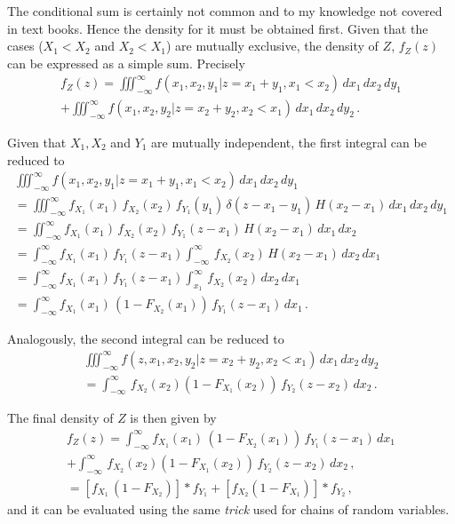 The conditional	 sum is certainly not common and to my knowledge not
covered in text books. Hence the density for it must be obtained first.
Given that the cases ($X_1<X_2$ and $X_2<X_1$) are mutually exclusive, the density of $Z$, 
$f_Z(z)$ can be expressed as a simple sum. Precisely
\begin{multline}
 f_Z(z) = \iiint_{-\infty}^\infty f(x_1,x_2,y_1|z=x_1+y_1,x_1<x_2)\,dx_1\,dx_2\,dy_1 \\
  + \iiint_{-\infty}^\infty f(x_1,x_2,y_2|z=x_2+y_2,x_2<x_1)\,dx_1\,dx_2\,dy_2\,. \nonumber
\end{multline}

Given that $X_1, X_2$ and $Y_1$ are mutually independent, the first integral can be reduced to
\begin{multline}
\iiint_{-\infty}^\infty f(x_1,x_2,y_1|z=x_1+y_1,x_1<x_2)\,dx_1\,dx_2\,dy_1 \\
  = \iiint_{-\infty}^\infty f_{X_1}(x_1)\,f_{X_2}(x_2)\,f_{Y_1}(y_1)\,\delta(z-x_1-y_1)\,H(x_2-x_1)\,dx_1\,dx_2\,dy_1\\
  = \iint_{-\infty}^\infty f_{X_1}(x_1)\,f_{X_2}(x_2)\,f_{Y_1}(z-x_1)\,H(x_2-x_1)\,dx_1\,dx_2\\
  = \int_{-\infty}^\infty f_{X_1}(x_1)\,f_{Y_1}(z-x_1)\int_{-\infty}^\infty \,f_{X_2}(x_2)\,H(x_2-x_1)\,dx_2\,dx_1\\
  = \int_{-\infty}^\infty f_{X_1}(x_1)\,f_{Y_1}(z-x_1)\int_{x_1}^{\infty} \,f_{X_2}(x_2)\,dx_2\,dx_1\\
  = \int_{-\infty}^\infty f_{X_1}(x_1)\,\left(1-F_{X_2}(x_1)\right)\,f_{Y_1}(z-x_1)\,dx_1\,. \nonumber
\end{multline}

Analogously, the second integral can be reduced to
\begin{multline}
\iiint_{-\infty}^\infty f(z,x_1,x_2,y_2|z=x_2+y_2,x_2<x_1)\,dx_1\,dx_2\,dy_2 \\
 = \int_{-\infty}^\infty \,f_{X_2}(x_2)\left(1-F_{X_1}(x_2)\right)\,f_{Y_2}(z-x_2)\,dx_2\,. \nonumber
\end{multline}

The final density of $Z$ is then given by
\begin{multline}
 f_Z(z) = \int_{-\infty}^\infty f_{X_1}(x_1)\,\left(1-F_{X_2}(x_1)\right)\,f_{Y_1}(z-x_1)\,dx_1\nonumber \\
  + \int_{-\infty}^\infty \,f_{X_2}(x_2)\left(1-F_{X_1}(x_2)\right)\,f_{Y_2}(z-x_2)\,dx_2\,, \nonumber \\
  = \left[f_{X_1}\,\left(1-F_{X_2}\right)\right]\ast f_{Y_1} 
       + \left[f_{X_2}\left(1-F_{X_1}\right)\right]\ast f_{Y_2}\,,\nonumber
\end{multline}
and it can be evaluated using the same \emph{trick} used for chains of random variables.

